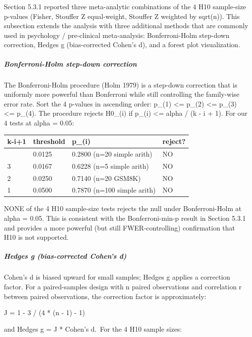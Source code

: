 \documentclass[
]{article}
\newcounter{none} %
\begin{document}
Section 5.3.1 reported three meta-analytic combinations of the 4 H10
sample-size p-values (Fisher, Stouffer Z equal-weight, Stouffer Z
weighted by sqrt(n)). This subsection extends the analysis with three
additional methods that are commonly used in psychology / pre-clinical
meta-analysis: Bonferroni-Holm step-down correction, Hedges g
(bias-corrected Cohen's d), and a forest plot visualization.

\subparagraph{Bonferroni-Holm step-down
correction}\label{bonferroni-holm-step-down-correction}

The Bonferroni-Holm procedure (Holm 1979) is a step-down correction that
is uniformly more powerful than Bonferroni while still controlling the
family-wise error rate. Sort the 4 p-values in ascending order: p\_(1)
\textless= p\_(2) \textless= p\_(3) \textless= p\_(4). The procedure
rejects H0\_(i) if p\_(i) \textless= alpha / (k - i + 1). For our 4
tests at alpha = 0.05:

{\def\LTcaptype{none} %
\begin{longtable}[]{@{}llll@{}}
\toprule\noalign{}
k-i+1 & threshold & p\_(i) & reject? \\
\midrule\noalign{}
\endhead
\bottomrule\noalign{}
\endlastfoot
4 & 0.0125 & 0.2800 (n=20 simple arith) & NO \\
3 & 0.0167 & 0.6228 (n=5 simple arith) & NO \\
2 & 0.0250 & 0.7140 (n=20 GSM8K) & NO \\
1 & 0.0500 & 0.7870 (n=100 simple arith) & NO \\
\end{longtable}
}

NONE of the 4 H10 sample-size tests rejects the null under
Bonferroni-Holm at alpha = 0.05. This is consistent with the
Bonferroni-min-p result in Section 5.3.1 and provides a more powerful
(but still FWER-controlling) confirmation that H10 is not supported.

\subparagraph{Hedges g (bias-corrected Cohen's
d)}\label{hedges-g-bias-corrected-cohens-d}

Cohen's d is biased upward for small samples; Hedges g applies a
correction factor. For a paired-samples design with n paired
observations and correlation r between paired observations, the
correction factor is approximately:

J = 1 - 3 / (4 * (n - 1) - 1)

and Hedges g = J * Cohen's d.~For the 4 H10 sample sizes:
\end{document}
